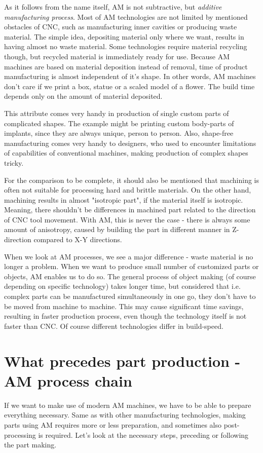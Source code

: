 \documentclass[a4paper, 11pt, reqno]{report}
\begin{document}
	As it follows from the name itself, AM is not subtractive, but \textit{additive manufacturing process}. Most of AM technologies are not limited by mentioned obstacles of CNC, such as manufacturing inner cavities or producing waste material. The simple idea, depositing material only where we want, results in having almost no waste material. Some technologies require material recycling though, but recycled material is immediately ready for use. Because AM machines are based on material deposition instead of removal, time of product manufacturing is almost independent of it's shape. In other words, AM machines don't care if we print a box, statue or a scaled model of a flower. The build time depends only on the amount of material deposited.

	This attribute comes very handy in production of single custom parts of complicated shapes. The example might be printing custom body-parts of implants, since they are always unique, person to person. Also, shape-free manufacturing comes very handy to designers, who used to encounter limitations of capabilities of conventional machines, making production of complex shapes tricky.
	
	For the comparison to be complete, it should also be mentioned that machining is often not suitable for processing hard and brittle materials. On the other hand, machining results in almost "isotropic part", if the material itself is isotropic. Meaning, there shouldn't be differences in machined part related to the direction of CNC tool movement. With AM, this is never the case - there is always some amount of anisotropy, caused by building the part in different manner in Z-direction compared to X-Y directions.
	
	When we look at AM processes, we see a major difference - waste material is no longer a problem. When we want to produce small number of customized parts or objects, AM enables us to do so. The general process of object making (of course depending on specific technology) takes longer time, but considered that i.e. complex parts can be manufactured simultaneously in one go, they don't have to be moved from machine to machine. This may cause significant time savings, resulting in faster production process, even though the technology itself is not faster than CNC. Of course different technologies differ in build-speed.


\section{What precedes part production - AM process chain}
If we want to make use of modern AM machines, we have to be able to prepare everything necessary. Same as with other manufacturing  technologies, making parts using AM requires more or less preparation, and sometimes also post-processing is required. Let's look at the necessary steps, preceding or following the part making.\\
\end{document}
